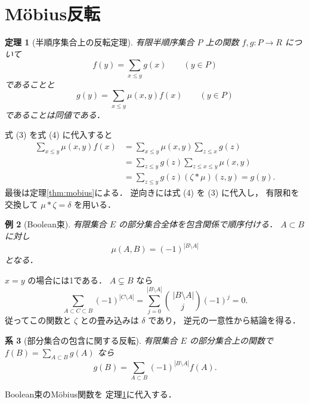 \documentclass[a5paper,10pt,onecolumn]{jsarticle}
\makeatletter
\theoremstyle{mathnotetheorem}
\newtheorem{theorem}{定理}[section]
\newtheorem{corollary}[theorem]{系}
\newtheorem{example}[theorem]{例}
\renewcommand{\proofname}{証明}
\renewenvironment{proof}[1][\proofname]{%
  \par\pushQED{\qed}\normalfont\topsep4\p@\@plus2\p@\relax
  \trivlist\item[\hskip\labelsep\bfseries #1]\ignorespaces
}{\popQED\endtrivlist\@endpefalse}
\makeatother
\begin{document}
\section{M\"obius反転}
\begin{theorem}[半順序集合上の反転定理]\label{thm:posetinv}
有限半順序集合 $P$ 上の関数 $f,g:P\to R$ について
\[
 f(y)=\sum_{x\le y}g(x)\qquad(y\in P)
 \tag{3}
\]
であることと
\[
 g(y)=\sum_{x\le y}\mu(x,y)f(x)\qquad(y\in P)
 \tag{4}
\]
であることは同値である．
\end{theorem}
\begin{proof}
式 (3) を式 (4) に代入すると
\[
 \begin{aligned}
 \sum_{x\le y}\mu(x,y)f(x)
 &=\sum_{x\le y}\mu(x,y)\sum_{z\le x}g(z)\\
 &=\sum_{z\le y}g(z)\sum_{z\le x\le y}\mu(x,y)\\
 &=\sum_{z\le y}g(z)(\zeta*\mu)(z,y)=g(y).
 \end{aligned}
\]
最後は定理\ref{thm:mobius}による．
逆向きには式 (4) を (3) に代入し，
有限和を交換して $\mu*\zeta=\delta$ を用いる．
\end{proof}
\begin{example}[Boolean束]
有限集合 $E$ の部分集合全体を包含関係で順序付ける．
$A\subset B$ に対し
\[
 \mu(A,B)=(-1)^{|B\setminus A|}
\]
となる．
\end{example}
\begin{proof}
$x=y$ の場合には1である．
$A\subsetneq B$ なら
\[
 \sum_{A\subset C\subset B}(-1)^{|C\setminus A|}
 =\sum_{j=0}^{|B\setminus A|}
 {\,|B\setminus A|\choose j}(-1)^j
 =0.
\]
従ってこの関数と $\zeta$ との畳み込みは $\delta$ であり，
逆元の一意性から結論を得る．
\end{proof}
\begin{corollary}[部分集合の包含に関する反転]
有限集合 $E$ の部分集合上の関数で
$f(B)=\sum_{A\subset B}g(A)$ なら
\[
 g(B)=\sum_{A\subset B}
 (-1)^{|B\setminus A|}f(A).
\]
\end{corollary}
\begin{proof}
Boolean束のM\"obius関数を
定理\ref{thm:posetinv}に代入する．
\end{proof}
\end{document}
